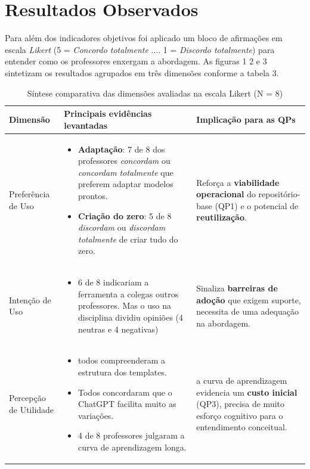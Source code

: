 \section{Resultados Observados}

Para além dos indicadores objetivos foi aplicado um bloco de afirmações em escala \textit{Likert} (5 = \textit{Concordo totalmente} .... 1 = \textit{Discordo totalmente})  para entender como os professores enxergam a abordagem. As figuras 1 2 e 3 sintetizam os resultados agrupados em três dimensões conforme a tabela 3.


\begin{table}[H]
    \centering
    \caption{Síntese comparativa das dimensões avaliadas na escala Likert (N = 8)}
    \label{tab:dimensoes-likert}
    \begin{tabular}{p{} p{} p{}}
        \toprule
        \textbf{Dimensão} & \textbf{Principais evidências levantadas} & \textbf{Implicação para as QPs}\\ \midrule
        Preferência de Uso &
        \begin{itemize}[leftmargin=*]
            \item \textbf{Adaptação}: 7 de 8 dos professores \textit{concordam} ou \textit{concordam totalmente} que preferem adaptar modelos prontos.%
            \item \textbf{Criação do zero}: 5 de 8 \textit{discordam} ou \textit{discordam totalmente} de criar tudo do zero.%
        \end{itemize} &
        Reforça a \textbf{viabilidade operacional} do repositório-base (QP1) e o potencial de \textbf{reutilização}. \\ \midrule
        
        Intenção de Uso &
        \begin{itemize}[leftmargin=*]
            \item 6 de 8 indicariam a ferramenta a colegas outros professores. Mas o uso na disciplina dividiu opiniões (4 neutras e 4 negativas)%
        \end{itemize} &
        Sinaliza \textbf{barreiras de adoção} que exigem suporte, necessita de uma adequação na abordagem. \\ \midrule
        
        Percepção de Utilidade &
        \begin{itemize}[leftmargin=*]
            \item todos compreenderam a estrutura dos templates.%
            \item Todos concordaram que o ChatGPT facilita muito as variações.%
            \item 4 de 8 professores julgaram a curva de aprendizagem longa.%
        \end{itemize} &
        a curva de aprendizagem evidencia um \textbf{custo inicial} (QP3), precisa de muito esforço cognitivo para o entendimento conceitual. \\ \bottomrule
    \end{tabular}
\end{table}



